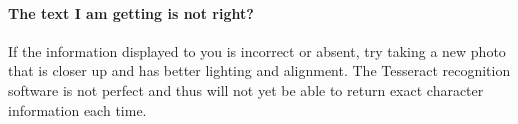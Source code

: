 \documentclass[12pt,a4paper]{article}
\begin{document}
    \paragraph{The text I am getting is not right? }
    If the information displayed to you is incorrect or absent, try taking a new photo that is closer up and has better lighting and alignment. The Tesseract recognition software is not perfect and thus will not yet be able to return exact character information each time. 
   
\end{document}
